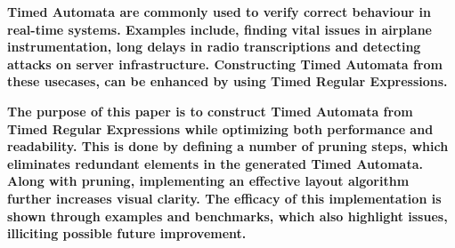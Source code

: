 \textbf{Timed Automata are commonly used to verify correct behaviour in real-time systems. Examples include, finding vital issues in airplane instrumentation, long delays in radio transcriptions and detecting attacks on server infrastructure. Constructing Timed Automata from these usecases, can be enhanced by using Timed Regular Expressions.}

\textbf{The purpose of this paper is to construct Timed Automata from Timed Regular Expressions while optimizing both performance and readability. This is done by defining a number of pruning steps, which eliminates redundant elements in the generated Timed Automata. Along with pruning, implementing an effective layout algorithm further increases visual clarity. The efficacy of this implementation is shown through examples and benchmarks, which also highlight issues, illiciting possible future improvement.}
